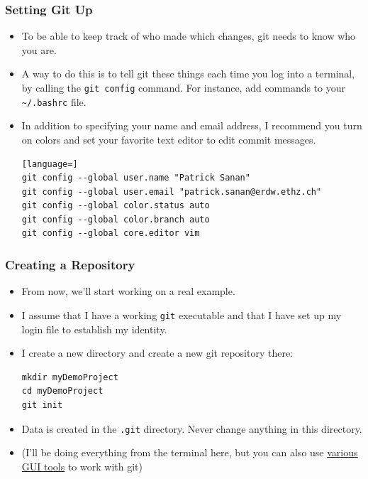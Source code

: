 \documentclass{beamer}
\begin{document}
\begin{frame}[fragile]
\frametitle{Setting Git Up}
\begin{itemize}
\item
To be able to keep track of who made which changes, git needs to know who you are.
\item 
A way to do this is to tell git these things each time you log into a terminal, by calling the \lstinline{git config} command. For instance, add commands to your \lstinline{~/.bashrc} file.
\item 
In addition to specifying your name and email address, I recommend you turn on colors and set your favorite text editor to edit commit messages.
\begin{lstlisting}[language=]
git config --global user.name "Patrick Sanan"
git config --global user.email "patrick.sanan@erdw.ethz.ch"
git config --global color.status auto
git config --global color.branch auto 
git config --global core.editor vim
\end{lstlisting}
\end{itemize}
\end{frame}

\begin{frame}[fragile]
\frametitle{Creating a Repository}
\begin{itemize}
\item From now, we'll start working on a real example. 
\item I assume that I have a working \lstinline{git} executable and that I have set up my login file to establish my identity.
\item I create a new directory and create a new git repository there:
\begin{lstlisting}
mkdir myDemoProject
cd myDemoProject
git init
\end{lstlisting}
\item Data is created in the \lstinline{.git} directory. Never change anything in this directory.
\item (I'll be doing everything from the terminal here, but you can also use \href{https://git-scm.com/downloads/guis}{various GUI tools} to work with git)
\end{itemize}
\end{frame}
\end{document}
